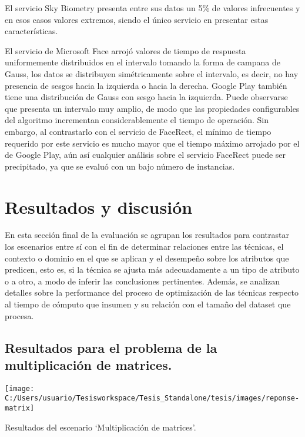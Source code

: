 El servicio Sky Biometry presenta entre sus datos un 5\% de valores
infrecuentes y en esos casos valores extremos, siendo el único servicio
en presentar estas características. 

El servicio de Microsoft Face arrojó valores de tiempo de respuesta
uniformemente distribuidos en el intervalo tomando la forma de campana
de Gauss, los datos se distribuyen simétricamente sobre el intervalo,
es decir, no hay presencia de sesgos hacia la izquierda o hacia la
derecha. Google Play también tiene una distribución de Gauss con sesgo
hacia la izquierda. Puede observarse que presenta un intervalo muy
amplio, de modo que las propiedades configurables del algoritmo incrementan
considerablemente el tiempo de operación. Sin embargo, al contrastarlo
con el servicio de FaceRect, el mínimo de tiempo requerido por este
servicio es mucho mayor que el tiempo máximo arrojado por el de Google
Play, aún así cualquier análisis sobre el servicio FaceRect puede
ser precipitado, ya que se evaluó con un bajo número de instancias. 


\section{Resultados y discusión\label{sec:Resultados-y-discusi=0000F3n}}

En esta sección final de la evaluación se agrupan los resultados para
contrastar los escenarios entre sí con el fin de determinar relaciones
entre las técnicas, el contexto o dominio en el que se aplican y el
desempeño sobre los atributos que predicen, esto es, si la técnica
se ajusta más adecuadamente a un tipo de atributo o a otro, a modo
de inferir las conclusiones pertinentes. Además, se analizan detalles
sobre la performance del proceso de optimización de las técnicas respecto
al tiempo de cómputo que insumen y su relación con el tamaño del dataset
que procesa. 


\subsection{Resultados para el problema de la multiplicación de matrices.}

\begin{table}[H]
\begin{centering}
\texttt{[image: C:/Users/usuario/Tesisworkspace/Tesis\_Standalone/tesis/images/reponse-matrix]}
\par\end{centering}

\caption{Resultados del escenario ‘Multiplicación de matrices’.\label{tab:Resultados-del-response-matrix}}
\end{table}


